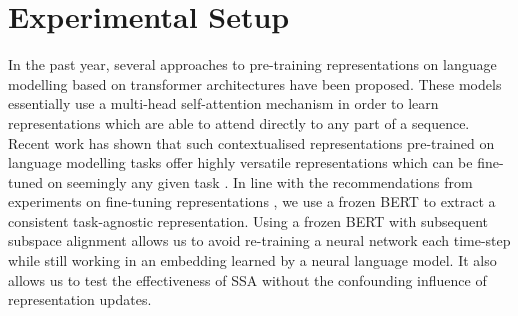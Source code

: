 \documentclass[letterpaper]{article} %
\begin{document}
\section{Experimental Setup} \label{sec:experiments}
In the past year, several approaches to pre-training representations on language modelling based on transformer architectures \cite{vaswani2017} have been proposed.
These models essentially use a multi-head self-attention mechanism in order to learn representations which are able to attend directly to any part of a sequence. %
Recent work has shown that such contextualised representations pre-trained on language modelling tasks offer highly versatile representations which can be fine-tuned on seemingly any given task \cite{elmo,bert,gpt,gpt2}.
In line with the recommendations from experiments on fine-tuning representations \cite{ruder:freeze}, we use a frozen BERT to extract a consistent task-agnostic representation. Using a frozen BERT with subsequent subspace alignment allows us to avoid re-training a neural network each time-step while still working in an embedding learned by a neural language model. It also allows us to test the effectiveness of SSA without the confounding influence of representation updates.
\end{document}
